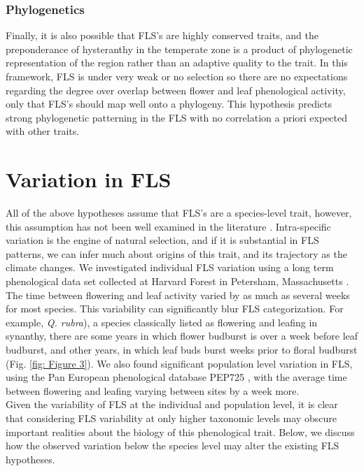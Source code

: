 \documentclass[12pt]{article}\usepackage[]{graphicx}\usepackage[]{color}
\begin{document}
\subsubsection*{Phylogenetics} 
\indent\indent Finally, it is also possible that FLS's are highly conserved traits, and the preponderance of hysteranthy in the temperate zone is a product of phylogenetic representation of the region rather than an adaptive quality to the trait. In this framework, FLS is under very weak or no selection so there are no expectations regarding the degree over overlap between flower and leaf phenological activity, only that FLS's should map well onto a phylogeny.  
This hypothesis predicts strong phylogenetic patterning in the FLS with no correlation a priori expected with other traits.\\
\section*{Variation in FLS}
 \indent\indent All of the above hypotheses assume that FLS's are a species-level trait, however, this assumption has not been well examined in the literature \citep[e.g.,][]{Gougherty2018}. Intra-specific variation is the engine of natural selection, and if it is substantial in FLS patterns, we can infer much about origins of this trait, and its trajectory as the climate changes.
 We investigated individual FLS variation using a long term phenological data set collected at Harvard Forest in Petersham, Massachusetts \citep{OKeefe2015}. The time between flowering and leaf activity varied by as much as several weeks for most species.  This variability  can significantly blur FLS categorization. For example,  \textit{Q. rubra}), a species classically listed as flowering and leafing in synanthy, there are some years in which flower budburst is over a week before leaf budburst, and other years, in which leaf buds burst weeks prior to floral budburst (Fig. \ref{fig: Figure 3}). We also found significant population level variation in FLS, using the Pan European phenological database PEP725 \citep{PEP725}, with the average time between flowering and leafing varying between sites by a week more.\\
\indent Given the variability of FLS at the individual and population level, it is clear that considering FLS variability at only higher taxonomic levels may obscure important realities about the biology of this phenological trait. Below, we discuss how the observed variation below the species level may alter the existing FLS hypotheses.
\end{document}
